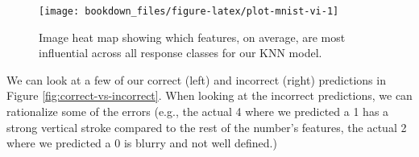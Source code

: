 \documentclass[]{krantz}
\makeatletter
\newenvironment{Shaded}{\begin{snugshade}}{\end{snugshade}}
\newcommand{\CharTok}[1]{\textcolor[rgb]{0.5,0.5,0.5}{#1}}
\newcommand{\CommentTok}[1]{\textcolor[rgb]{0.37,0.37,0.37}{\textit{#1}}}
\newcommand{\DataTypeTok}[1]{\textcolor[rgb]{0.27,0.27,0.27}{#1}}
\newcommand{\DecValTok}[1]{\textcolor[rgb]{0.06,0.06,0.06}{#1}}
\newcommand{\FloatTok}[1]{\textcolor[rgb]{0.06,0.06,0.06}{#1}}
\newcommand{\KeywordTok}[1]{\textcolor[rgb]{0.27,0.27,0.27}{\textbf{#1}}}
\newcommand{\NormalTok}[1]{#1}
\newcommand{\OperatorTok}[1]{\textcolor[rgb]{0.43,0.43,0.43}{\textbf{#1}}}
\newcommand{\StringTok}[1]{\textcolor[rgb]{0.5,0.5,0.5}{#1}}
\newenvironment{kframe}{%
\medskip{}
\setlength{\fboxsep}{.8em}
 \def\at@end@of@kframe{}%
 \ifinner\ifhmode%
  \def\at@end@of@kframe{\end{minipage}}%
  \begin{minipage}{\columnwidth}%
 \fi\fi%
 \def\FrameCommand##1{\hskip\@totalleftmargin \hskip-\fboxsep
 \colorbox{shadecolor}{##1}\hskip-\fboxsep
     \hskip-\linewidth \hskip-\@totalleftmargin \hskip\columnwidth}%
 \MakeFramed {\advance\hsize-\width
   \@totalleftmargin\z@ \linewidth\hsize
   \@setminipage}}%
 {\par\unskip\endMakeFramed%
 \at@end@of@kframe}
\renewenvironment{Shaded}{\begin{kframe}}{\end{kframe}}
\makeatother
\begin{document}
\begin{Shaded}
\end{Shaded}

\begin{figure}

{\centering \texttt{[image: bookdown\_files/figure-latex/plot-mnist-vi-1]} 

}

\caption{Image heat map showing which features, on average, are most influential across all response classes for our KNN model.}\label{fig:plot-mnist-vi}
\end{figure}

We can look at a few of our correct (left) and incorrect (right) predictions in Figure \ref{fig:correct-vs-incorrect}. When looking at the incorrect predictions, we can rationalize some of the errors (e.g., the actual 4 where we predicted a 1 has a strong vertical stroke compared to the rest of the number's features, the actual 2 where we predicted a 0 is blurry and not well defined.)
\end{document}
